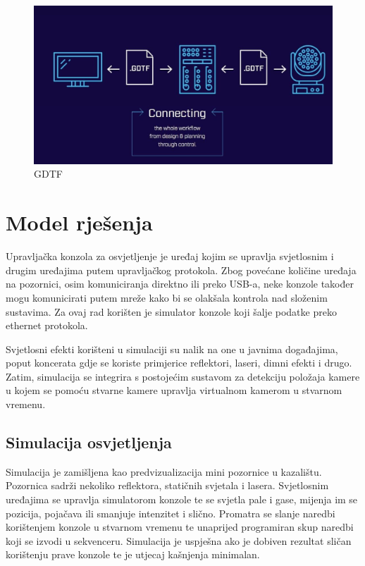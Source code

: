 \documentclass[times, utf8, zavrsni, numeric]{fer}
\begin{document}
\begin{figure}[htp]
	\centering
	\includegraphics[width=\linewidth]{slika 3-5.png}
	\caption{GDTF \cite{GDTF}}
	\label{fig:slika 3-5}
\end{figure}

\chapter{Model rješenja}
Upravljačka konzola za osvjetljenje je uređaj kojim se upravlja svjetlosnim i drugim uređajima putem upravljačkog protokola. Zbog povećane količine uređaja na pozornici, osim komuniciranja direktno ili preko USB-a, neke konzole također mogu komunicirati putem mreže kako bi se olakšala kontrola nad složenim sustavima. Za ovaj rad korišten je simulator konzole koji šalje podatke preko ethernet protokola. \newline

Svjetlosni efekti korišteni u simulaciji su nalik na one u javnima događajima, poput koncerata gdje se koriste primjerice reflektori, laseri, dimni efekti i drugo.
Zatim, simulacija se integrira s postojećim sustavom za detekciju položaja kamere u kojem se pomoću stvarne kamere upravlja virtualnom kamerom u stvarnom vremenu.

\section{Simulacija osvjetljenja}
Simulacija je zamišljena kao predvizualizacija mini pozornice u kazalištu. Pozornica sadrži nekoliko reflektora, statičnih svjetala i lasera. Svjetlosnim uređajima se upravlja simulatorom konzole te se svjetla pale i gase, mijenja im se pozicija, pojačava ili smanjuje intenzitet i slično. Promatra se slanje naredbi korištenjem konzole u stvarnom vremenu te unaprijed programiran skup naredbi koji se izvodi u sekvenceru. Simulacija je uspješna ako je dobiven rezultat sličan korištenju prave konzole te je utjecaj kašnjenja minimalan.
\end{document}
